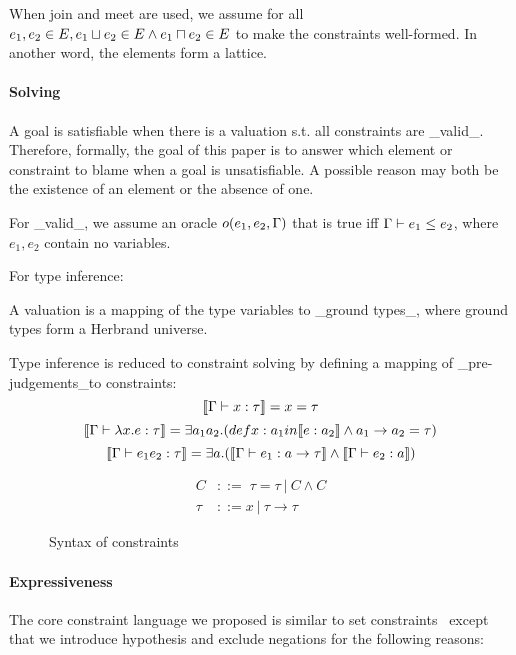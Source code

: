 When join and meet are used, we assume for all $e_1, e_2 \in E, e_1 \sqcup e_2
\in E \land e_1 \sqcap e_2 \in E$ to make the constraints well-formed. In
another word, the elements form a lattice.

\paragraph{Solving}
 
A goal is satisfiable when there is a valuation s.t. all constraints
are _valid_. Therefore, formally, the goal of this paper is to answer
which element or constraint to blame when a goal is unsatisfiable. A
possible reason may both be the existence of an element or the absence
of one.

For _valid_, we assume an oracle $o(e_1, e_2, \Gamma)$ that is true iff
$\Gamma \vdash e_1 \leq e_2$, where $e_1, e_2$ contain no variables. 

For type inference:

A valuation is a mapping of the type variables to _ground types_,
where ground types form a Herbrand universe.

Type inference is reduced to constraint solving by defining a mapping
of _pre-judgements_to constraints:
\[\llbracket \Gamma \vdash x:\tau \rrbracket = x =\tau\]
\[\llbracket \Gamma \vdash \lambda x.e:\tau \rrbracket = \exists a_1 a_2.
(def x: a_1 in \llbracket e:a_2 \rrbracket \land a_1 \rightarrow a_2 =\tau)\]
\[\llbracket \Gamma\vdash e_1 e_2 : \tau \rrbracket = \exists a.(\llbracket \Gamma \vdash
e_1:a\rightarrow \tau \rrbracket\land \llbracket \Gamma\vdash e_2:a \rrbracket)\]


\begin{figure}[b]
\begin{align*}
C &::=\; \tau = \tau\ |\ C \land C \\
\tau &::= x\ |\ \tau\rightarrow \tau
\end{align*}
\caption{Syntax of constraints}
\label{figure:cons:syntax}
\end{figure}

\paragraph{Expressiveness}

The core constraint language we proposed is similar to set
constraints~\cite{aiken-setconstraint} except that we introduce hypothesis and
exclude negations for the following reasons:

